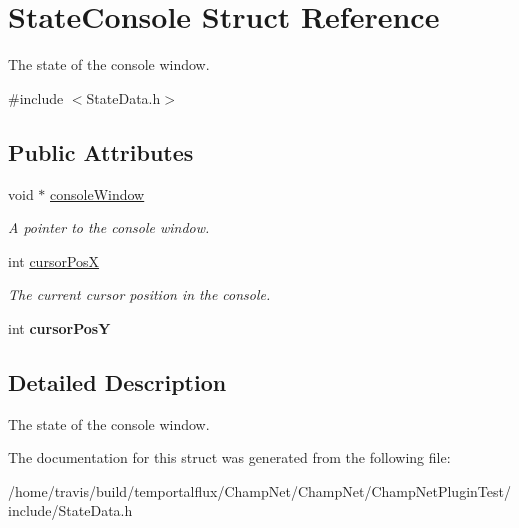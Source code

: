 \hypertarget{struct_state_console}{\section{State\-Console Struct Reference}
\label{struct_state_console}
}


The state of the console window.  




{\ttfamily \#include $<$State\-Data.\-h$>$}

\subsection*{Public Attributes}
\begin{DoxyCompactItemize}
\item 
\hypertarget{struct_state_console_a101e38bf2e857e66c26c4372e5e1d287}{void $\ast$ \hyperlink{struct_state_console_a101e38bf2e857e66c26c4372e5e1d287}{console\-Window}}\label{struct_state_console_a101e38bf2e857e66c26c4372e5e1d287}

\begin{DoxyCompactList}\small\item\em A pointer to the console window. \end{DoxyCompactList}\item 
\hypertarget{struct_state_console_ae75b5a93145d506e18b8ee8c3c1f4e2b}{int \hyperlink{struct_state_console_ae75b5a93145d506e18b8ee8c3c1f4e2b}{cursor\-Pos\-X}}\label{struct_state_console_ae75b5a93145d506e18b8ee8c3c1f4e2b}

\begin{DoxyCompactList}\small\item\em The current cursor position in the console. \end{DoxyCompactList}\item 
\hypertarget{struct_state_console_a76f3facf37788fb17949a59e1829ccd5}{int {\bfseries cursor\-Pos\-Y}}\label{struct_state_console_a76f3facf37788fb17949a59e1829ccd5}

\end{DoxyCompactItemize}


\subsection{Detailed Description}
The state of the console window. 

The documentation for this struct was generated from the following file\-:\begin{DoxyCompactItemize}
\item 
/home/travis/build/temportalflux/\-Champ\-Net/\-Champ\-Net/\-Champ\-Net\-Plugin\-Test/include/State\-Data.\-h\end{DoxyCompactItemize}
